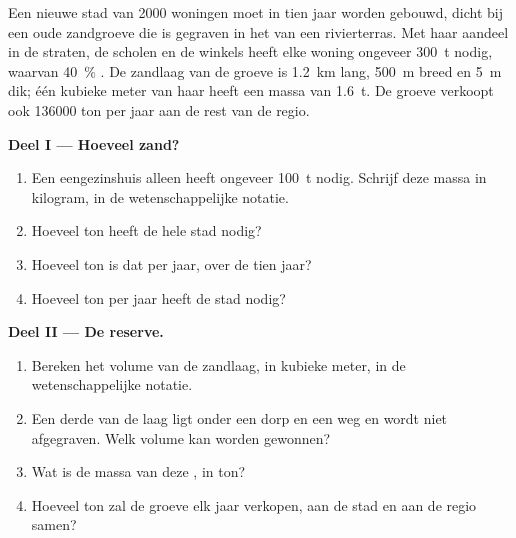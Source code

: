 \begin{problem}
\label{pb:g9:earth-resources:1}
Een nieuwe stad van \num{2000} woningen moet in tien jaar worden gebouwd,
dicht bij een oude zandgroeve die is gegraven in het  van een
rivierterras. Met haar aandeel in de straten, de scholen en de winkels
heeft elke woning ongeveer \qty{300}{t}  nodig, waarvan
\qty{40}{\%} . De zandlaag van de groeve is \qty{1.2}{km} lang,
\qty{500}{m} breed en \qty{5}{m} dik; één kubieke meter van haar  heeft
een massa van \qty{1.6}{t}. De groeve verkoopt ook \num{136000} ton 
per jaar aan de rest van de regio.

\noindent\textbf{Deel I --- Hoeveel zand?}\par\nopagebreak
\begin{enumerate}[beginpenalty=10000]
  \item Een eengezinshuis alleen heeft ongeveer \qty{100}{t}
         nodig. Schrijf deze massa in kilogram, in de
        wetenschappelijke notatie.
  \item Hoeveel ton  heeft de hele stad nodig?
  \item Hoeveel ton is dat per jaar, over de tien jaar?
  \item Hoeveel ton  per jaar heeft de stad nodig?
\end{enumerate}

\noindent\textbf{Deel II --- De reserve.}\par\nopagebreak
\begin{enumerate}[resume, beginpenalty=10000]
  \item Bereken het volume van de zandlaag, in kubieke meter, in de
        wetenschappelijke notatie.
  \item Een derde van de laag ligt onder een dorp en een weg en wordt niet
        afgegraven. Welk volume kan worden gewonnen?
  \item Wat is de massa van deze , in ton?
  \item Hoeveel ton  zal de groeve elk jaar verkopen, aan de stad en
        aan de regio samen?
\end{enumerate}


\end{problem}
